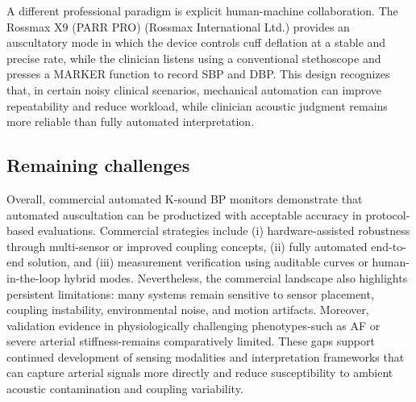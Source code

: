 \documentclass[
  12pt,
  letterpaper,
  openany,
  oneside]{book}
\begin{document}
A different professional paradigm is explicit human-machine
collaboration. The Rossmax X9 (PARR PRO) (Rossmax International Ltd.)
provides an auscultatory mode in which the device controls cuff
deflation at a stable and precise rate, while the clinician listens
using a conventional stethoscope and presses a MARKER function to record
SBP and DBP. This design recognizes that, in certain noisy clinical
scenarios, mechanical automation can improve repeatability and reduce
workload, while clinician acoustic judgment remains more reliable than
fully automated interpretation.

\subsection{Remaining challenges}\label{remaining-challenges}

Overall, commercial automated K-sound BP monitors demonstrate that
automated auscultation can be productized with acceptable accuracy in
protocol-based evaluations. Commercial strategies include (i)
hardware-assisted robustness through multi-sensor or improved coupling
concepts, (ii) fully automated end-to-end solution, and (iii)
measurement verification using auditable curves or human-in-the-loop
hybrid modes. Nevertheless, the commercial landscape also highlights
persistent limitations: many systems remain sensitive to sensor
placement, coupling instability, environmental noise, and motion
artifacts. Moreover, validation evidence in physiologically challenging
phenotypes-such as AF or severe arterial stiffness-remains comparatively
limited. These gaps support continued development of sensing modalities
and interpretation frameworks that can capture arterial signals more
directly and reduce susceptibility to ambient acoustic contamination and
coupling variability.
\end{document}
